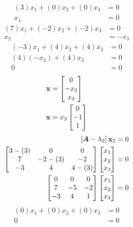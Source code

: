 \documentclass{article}
\begin{document}
\begin{align*}
	(3)x_1 + (0)x_2 + (0)x_3 & = 0 \\
	x_1 & = 0
\end{align*}
\begin{align*}
	(7)x_1 + (-2)x_2 + (-2)x_3 & = 0 \\
	x_2 & = -x_3
\end{align*}
\begin{align*}
	(-3)x_1 + (4)x_2 + (4)x_3 & = 0 \\
	(4)(-x_3) + (4)x_3 & = 0 \\
	0 & = 0
\end{align*}
\begin{align*}
	\vect{x} & = \begin{bmatrix} 0 \\ -x_3 \\ x_3 \end{bmatrix} \\
	\vect{x} & = x_3 \begin{bmatrix} 0 \\ -1 \\ 1 \end{bmatrix}
\end{align*}
\begin{align*}
	\left[ \matr{A} - \lambda_2 \right] \vect{x}_2 & = 0 \\
	\begin{bmatrix}
		3 - (3) & 0 & 0 \\
		7 & -2 - (3) & -2 \\
		-3 & 4 & 4- (3)
	\end{bmatrix}
	\begin{bmatrix} x_1 \\ x_2 \\ x_3 \end{bmatrix} & = 0 \\
	\begin{bmatrix}
		0 & 0 & 0 \\
		7 & -5 & -2 \\
		-3 & 4 & 1
	\end{bmatrix}
	\begin{bmatrix} x_1 \\ x_2 \\ x_3 \end{bmatrix} & = 0
\end{align*}
\begin{align*}
	(0)x_1 + (0)x_2 + (0)x_3 & = 0 \\
	0 & = 0
\end{align*}
\end{document}
